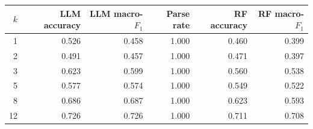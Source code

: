 \begin{tabular}{@{}rrrrrr@{}}
\toprule
$k$ & LLM accuracy & LLM macro-$F_1$ & Parse rate & RF accuracy & RF macro-$F_1$ \\
\midrule
1 & 0.526 & 0.458 & 1.000 & 0.460 & 0.399 \\
2 & 0.491 & 0.457 & 1.000 & 0.471 & 0.397 \\
3 & 0.623 & 0.599 & 1.000 & 0.560 & 0.538 \\
5 & 0.577 & 0.574 & 1.000 & 0.549 & 0.522 \\
8 & 0.686 & 0.687 & 1.000 & 0.623 & 0.593 \\
12 & 0.726 & 0.726 & 1.000 & 0.711 & 0.708 \\
\bottomrule
\end{tabular}
